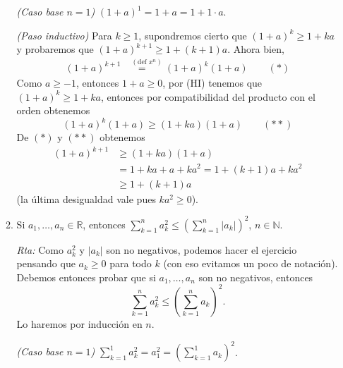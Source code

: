 \documentclass[12pt,spanish,makeidx]{amsbook}
\newcommand{\rta}{\noindent\textit{Rta: }}
\begin{document}
\begin{enumerate}
\begin{enumerate}
			\textit{(Caso base $n=1$) } $(1+a)^1 = 1+a = 1+ 1\cdot a$. 
			
			\textit{(Paso inductivo) }  Para  $k \ge 1$,  supondremos cierto que $(1+a)^k\geq 1+k a$ y probaremos  que $(1+a)^{k+1}\geq 1+(k+1) a$. Ahora bien, 
			\begin{align*}
			(1+a)^{k+1} &\overset{(\text{def } x^n)}{=\quad} (1+a)^k(1+a) \qquad (*)
			\end{align*}
			Como $a\ge -1$, entonces $1+a \ge 0$, por (HI) tenemos  que $(1+a)^k\geq 1+k a$, entonces  por compatibilidad del  producto con el orden obtenemos
			\begin{equation*}
				(1+a)^k(1+a) \ge   (1+k a)(1+a)  \qquad (**)
			\end{equation*}
			De $(*)$ y $(**)$ obtenemos
			\begin{align*}
			(1+a)^{k+1} &\ge (1+k a)(1+a) \\
			&= 1+ ka + a + ka^2 = 1 + (k+1)a + ka^2 \\
			&\ge 1 + (k+1)a
			\end{align*}
			(la última desigualdad vale pues $ka^2 \ge 0$). 
			
			
			\item Si $a_1,\dots,a_n \in \mathbb R$, entonces $\displaystyle{\sum_{k=1}^n a_{k}^{2}\leq \left(\sum_{k=1}^n |a_{k}|\right)^{2}}$, $n\in \mathbb N$.
			
			\rta Como $a_k^2$ y $|a_k|$ son no negativos, podemos hacer el ejercicio pensando que $a_k \ge 0$ para todo $k$ (con eso evitamos un poco de notación). Debemos entonces probar que  si $a_1,\dots,a_n $ son no negativos, entonces
			\begin{equation*}
				\sum_{k=1}^n a_{k}^{2}\leq \left(\sum_{k=1}^n a_{k}\right)^{2}. 
			\end{equation*} 
			Lo haremos por inducción en $n$.
			 
			\textit{(Caso base $n=1$) } $\sum_{k=1}^1 a_{k}^{2} = a_1^2 = (\sum_{k=1}^1 a_{k})^{2}$.
			

\end{enumerate}
\end{enumerate}
\end{document}
